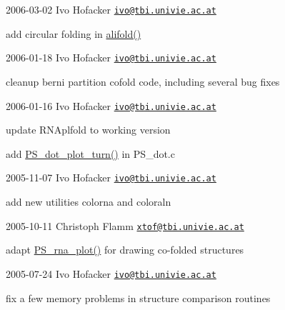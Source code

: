 2006-\/03-\/02 Ivo Hofacker \href{mailto:ivo@tbi.univie.ac.at}{\tt ivo@tbi.\+univie.\+ac.\+at}


\begin{DoxyItemize}
\item add circular folding in \mbox{\hyperlink{group__consensus__mfe__fold_ga4cf00f0659e5f0480335d69e797f05b1}{alifold()}}
\end{DoxyItemize}

2006-\/01-\/18 Ivo Hofacker \href{mailto:ivo@tbi.univie.ac.at}{\tt ivo@tbi.\+univie.\+ac.\+at}


\begin{DoxyItemize}
\item cleanup berni partition cofold code, including several bug fixes
\end{DoxyItemize}

2006-\/01-\/16 Ivo Hofacker \href{mailto:ivo@tbi.univie.ac.at}{\tt ivo@tbi.\+univie.\+ac.\+at}


\begin{DoxyItemize}
\item update R\+N\+Aplfold to working version
\item add \mbox{\hyperlink{group__plotting__utils_ga5582a502d39ec3bc8d5ba3262102991c}{P\+S\+\_\+dot\+\_\+plot\+\_\+turn()}} in P\+S\+\_\+dot.\+c
\end{DoxyItemize}

2005-\/11-\/07 Ivo Hofacker \href{mailto:ivo@tbi.univie.ac.at}{\tt ivo@tbi.\+univie.\+ac.\+at}


\begin{DoxyItemize}
\item add new utilities colorna and coloraln
\end{DoxyItemize}

2005-\/10-\/11 Christoph Flamm \href{mailto:xtof@tbi.univie.ac.at}{\tt xtof@tbi.\+univie.\+ac.\+at}


\begin{DoxyItemize}
\item adapt \mbox{\hyperlink{plot__structure_8h_a0873c7cc4cd7a11c9a2cea19dde7e9c9}{P\+S\+\_\+rna\+\_\+plot()}} for drawing co-\/folded structures
\end{DoxyItemize}

2005-\/07-\/24 Ivo Hofacker \href{mailto:ivo@tbi.univie.ac.at}{\tt ivo@tbi.\+univie.\+ac.\+at}


\begin{DoxyItemize}
\item fix a few memory problems in structure comparison routines
\end{DoxyItemize}

